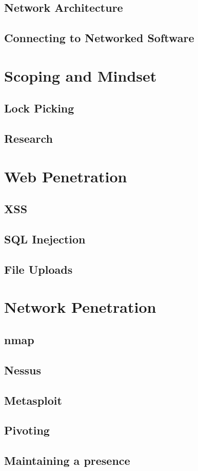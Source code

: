 \documentclass[a4paper,11pt]{report}
\begin{document}
	\section{Network Architecture}
	\section{Connecting to Networked Software}
\chapter{Scoping and Mindset}
	\section{Lock Picking}
	\section{Research}
\chapter{Web Penetration}
	\section{XSS}
	\section{SQL Inejection}
	\section{File Uploads}
\chapter{Network Penetration}
	\section{nmap}
	\section{Nessus}
	\section{Metasploit}
	\section{Pivoting}
	\section{Maintaining a presence}
\end{document}
